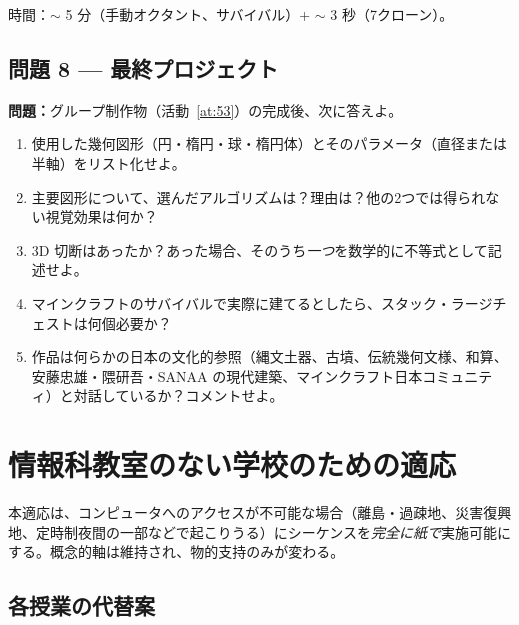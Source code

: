 \documentclass[12pt,a4paper]{scrartcl}
\begin{document}
時間：$\sim$ 5 分（手動オクタント、サバイバル）+ $\sim$ 3 秒（7クローン）。

\subsection*{問題 8 --- 最終プロジェクト}
\textbf{問題：}グループ制作物（活動~\ref{at:53}）の完成後、次に答えよ。
\begin{enumerate}[label=(\arabic*),leftmargin=1.7em,itemsep=0.15em,topsep=0.2em,nosep]
  \item 使用した幾何図形（円・楕円・球・楕円体）とそのパラメータ（直径または半軸）をリスト化せよ。
  \item 主要図形について、選んだアルゴリズムは？理由は？他の2つでは得られない視覚効果は何か？
  \item 3D 切断はあったか？あった場合、そのうち\emph{一つ}を数学的に不等式として記述せよ。
  \item マインクラフトのサバイバルで実際に建てるとしたら、スタック・ラージチェストは何個必要か？
  \item 作品は何らかの日本の文化的参照（縄文土器、古墳、伝統幾何文様、和算、安藤忠雄・隈研吾・SANAA の現代建築、マインクラフト日本コミュニティ）と対話しているか？コメントせよ。
\end{enumerate}

\newpage
\section{情報科教室のない学校のための適応}\label{ap:adapt-analog}

本適応は、コンピュータへのアクセスが不可能な場合（離島・過疎地、災害復興地、定時制夜間の一部などで起こりうる）にシーケンスを\emph{完全に紙で}実施可能にする。概念的軸は維持され、物的支持のみが変わる。

\subsection{各授業の代替案}
\end{document}
